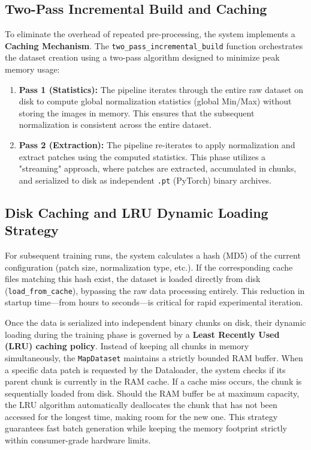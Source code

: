 \subsection{Two-Pass Incremental Build and Caching}
To eliminate the overhead of repeated pre-processing, the system implements a \textbf{Caching Mechanism}.
The \texttt{two\_pass\_incremental\_build} function orchestrates the dataset creation using a two-pass algorithm designed to minimize peak memory usage:

\begin{enumerate}
    \item \textbf{Pass 1 (Statistics):} The pipeline iterates through the entire raw dataset on disk to compute global normalization statistics (global Min/Max) without storing the images in memory. This ensures that the subsequent normalization is consistent across the entire dataset.
    \item \textbf{Pass 2 (Extraction):} The pipeline re-iterates to apply normalization and extract patches using the computed statistics. This phase utilizes a "streaming" approach, where patches are extracted, accumulated in chunks, and serialized to disk as independent \texttt{.pt} (PyTorch) binary archives.
\end{enumerate}

\subsection{Disk Caching and LRU Dynamic Loading Strategy}
For subsequent training runs, the system calculates a hash (MD5) of the current configuration (patch size, normalization type, etc.).
If the corresponding cache files matching this hash exist, the dataset is loaded directly from disk (\texttt{load\_from\_cache}), bypassing the raw data processing entirely.
This reduction in startup time—from hours to seconds—is critical for rapid experimental iteration.

Once the data is serialized into independent binary chunks on disk, their dynamic loading during the training phase is governed by a \textbf{Least Recently Used (LRU) caching policy}.
Instead of keeping all chunks in memory simultaneously, the \texttt{MapDataset} maintains a strictly bounded RAM buffer.
When a specific data patch is requested by the Dataloader, the system checks if its parent chunk is currently in the RAM cache.
If a cache miss occurs, the chunk is sequentially loaded from disk.
Should the RAM buffer be at maximum capacity, the LRU algorithm automatically deallocates the chunk that has not been accessed for the longest time, making room for the new one.
This strategy guarantees fast batch generation while keeping the memory footprint strictly within consumer-grade hardware limits.

